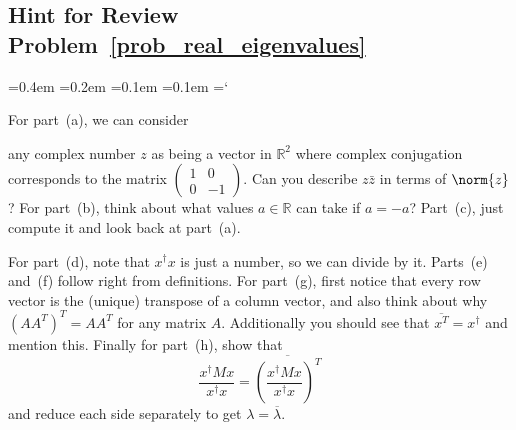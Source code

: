 
\subsection*{Hint for Review Problem~\ref{prob_real_eigenvalues}}

{\ttfamily
{}\font=0.4em
\font=0.2em
\font=0.1em
\font=0.1em
\hyphenchar\font=`\-


\hypertarget{scripts_diagonalizing_symmetric_matrices_hint}{For part~(a), we can consider} any complex number $z$ as being a vector in $\mathbb{R}^2$ where complex conjugation corresponds to the matrix $\begin{pmatrix} 1 & 0 \\ 0 & -1 \end{pmatrix}$. Can you describe $z \bar{z}$ in terms of $\norm{z}$? For part~(b), think about what values $a \in \mathbb{R}$ can take if $a = -a$? Part~(c), just compute it and look back at part~(a).

For part~(d), note that $x^{\dagger} x$ is just a number, so we can divide by it. Parts~(e) and~(f) follow right from definitions. For part~(g), first notice that every row vector is the (unique) transpose of a column vector, and also think about why $(A A^T)^T = A A^T$ for any matrix $A$. Additionally you should see that $\overline{x^T} = x^{\dagger}$ and mention this. Finally for part~(h), show that
\[
\frac{x^{\dagger} M x}{x^{\dagger} x} = \overline{\left(\frac{x^{\dagger} M x}{x^{\dagger} x}\right)^T}
\]
and reduce each side separately to get $\lambda = \overline{\lambda}$.

} %

